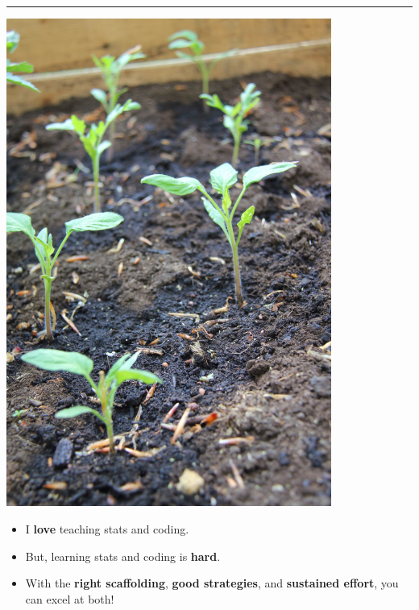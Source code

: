 \documentclass[
  letterpaper,
  DIV=11,
  numbers=noendperiod]{scrartcl}
\providecommand{\tightlist}{%
  \setlength{\itemsep}{0pt}\setlength{\parskip}{0pt}}\usepackage{longtable,booktabs,array}
\begin{document}
\begin{center}\rule{0.5\linewidth}{0.5pt}\end{center}

\includegraphics[width=0.8\textwidth,height=\textheight]{img/seedlings.jpg}

\hfill\break
\hfill\break

\begin{itemize}
\tightlist
\item
  I \textbf{love} teaching stats and coding.
\end{itemize}

\hfill\break

\begin{itemize}
\tightlist
\item
  But, learning stats and coding is \textbf{hard}.
\end{itemize}

\hfill\break

\begin{itemize}
\tightlist
\item
  With the \textbf{right scaffolding}, \textbf{good strategies}, and
  \textbf{sustained effort}, you can excel at both!
\end{itemize}
\end{document}
